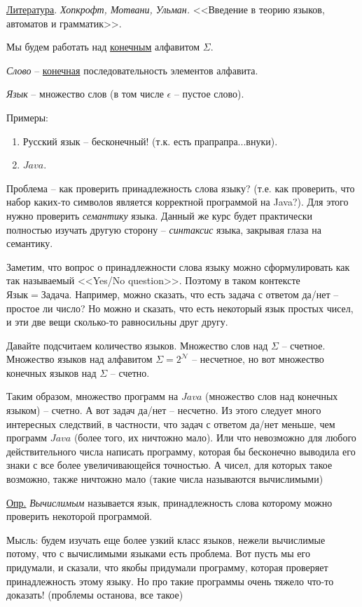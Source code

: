 \underline{Литература}. \textit{Хопкрофт, Мотвани, Ульман.} <<Введение в теорию языков, автоматов и грамматик>>.

Мы будем работать над \underline{конечным} алфавитом $ \Sigma $.

\textit{Слово} -- \underline{конечная} последовательность элементов алфавита.

\textit{Язык} -- множество слов (в том числе $ \epsilon $ -- пустое слово).

Примеры:

\begin{enumerate}
	\item Русский язык -- бесконечный! (т.к. есть прапрапра...внуки).
	
	\item $ Java $.
	
\end{enumerate} 

Проблема -- как проверить принадлежность слова языку? (т.е. как проверить, что набор каких-то символов является корректной программой на Java?). Для этого нужно проверить \textit{семантику} языка. Данный же курс будет практически полностью изучать другую сторону -- \textit{синтаксис} языка, закрывая глаза на семантику. 

Заметим, что вопрос о принадлежности слова языку можно сформулировать как так называемый <<Yes/No question>>. Поэтому в таком контексте $ Язык = Задача $. Например, можно сказать, что есть задача с ответом да/нет -- простое ли число? Но можно и сказать, что есть некоторый язык простых чисел, и эти две вещи сколько-то равносильны друг другу.

Давайте подсчитаем количество языков. Множество слов над $ \Sigma $ -- счетное. Множество языков над алфавитом $ \Sigma = 2^{\mathcal{N}}$ -- несчетное, но вот множество конечных языков над $ \Sigma $ -- счетно. 

Таким образом, множество программ на $ Java $ (множество слов над конечных языком) -- счетно. А вот задач да/нет -- несчетно. Из этого следует много интересных следствий, в частности, что задач с ответом да/нет меньше, чем программ $ Java $ (более того, их ничтожно мало). Или что невозможно для любого действительного числа написать программу, которая бы бесконечно выводила его знаки с все более увеличивающейся точностью. А чисел, для которых такое возможно, также ничтожно мало (такие числа называются вычислимыми)

\underline{Опр.} \textit{Вычислимым} называется язык, принадлежность слова которому можно проверить некоторой программой. 

Мысль: будем изучать еще более узкий класс языков, нежели вычислимые потому, что с вычислимыми языками есть проблема. Вот пусть мы его придумали, и сказали, что якобы придумали программу, которая проверяет принадлежность этому языку. Но про такие программы очень тяжело что-то доказать! (проблемы останова, все такое)

